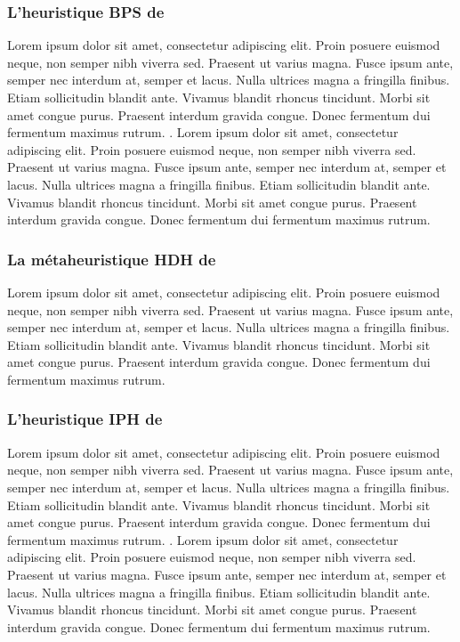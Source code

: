 \subsubsection{L'heuristique BPS de \parencite{bertazzi_improved_2004}}
Lorem ipsum dolor sit amet, consectetur adipiscing elit. Proin posuere euismod neque, non semper nibh viverra sed. Praesent ut varius magna. Fusce ipsum ante, semper nec interdum at, semper et lacus. Nulla ultrices magna a fringilla finibus. Etiam sollicitudin blandit ante. Vivamus blandit rhoncus tincidunt. Morbi sit amet congue purus. Praesent interdum gravida congue. Donec fermentum dui fermentum maximus rutrum. \parencite{paletta_period_2002}. Lorem ipsum dolor sit amet, consectetur adipiscing elit. Proin posuere euismod neque, non semper nibh viverra sed. Praesent ut varius magna. Fusce ipsum ante, semper nec interdum at, semper et lacus. Nulla ultrices magna a fringilla finibus. Etiam sollicitudin blandit ante. Vivamus blandit rhoncus tincidunt. Morbi sit amet congue purus. Praesent interdum gravida congue. Donec fermentum dui fermentum maximus rutrum.

\medskip

\subsubsection{La métaheuristique HDH de \parencite{hemmelmayr_variable_2009}}
\label{sub-sec:hdh}
Lorem ipsum dolor sit amet, consectetur adipiscing elit. Proin posuere euismod neque, non semper nibh viverra sed. Praesent ut varius magna. Fusce ipsum ante, semper nec interdum at, semper et lacus. Nulla ultrices magna a fringilla finibus. Etiam sollicitudin blandit ante. Vivamus blandit rhoncus tincidunt. Morbi sit amet congue purus. Praesent interdum gravida congue. Donec fermentum dui fermentum maximus rutrum.
\medskip

\subsubsection{L'heuristique IPH de \parencite{gulczynski_period_2011}}
Lorem ipsum dolor sit amet, consectetur adipiscing elit. Proin posuere euismod neque, non semper nibh viverra sed. Praesent ut varius magna. Fusce ipsum ante, semper nec interdum at, semper et lacus. Nulla ultrices magna a fringilla finibus. Etiam sollicitudin blandit ante. Vivamus blandit rhoncus tincidunt. Morbi sit amet congue purus. Praesent interdum gravida congue. Donec fermentum dui fermentum maximus rutrum. \parencite{chao_new_1995}. Lorem ipsum dolor sit amet, consectetur adipiscing elit. Proin posuere euismod neque, non semper nibh viverra sed. Praesent ut varius magna. Fusce ipsum ante, semper nec interdum at, semper et lacus. Nulla ultrices magna a fringilla finibus. Etiam sollicitudin blandit ante. Vivamus blandit rhoncus tincidunt. Morbi sit amet congue purus. Praesent interdum gravida congue. Donec fermentum dui fermentum maximus rutrum.

